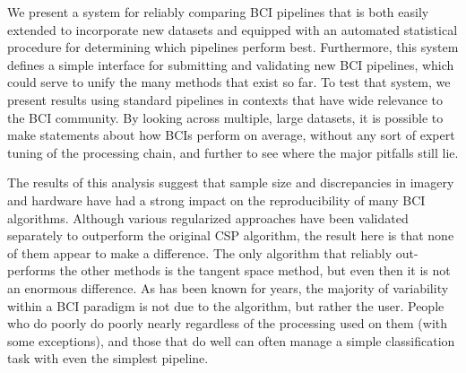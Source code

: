 We present a system for reliably comparing BCI pipelines that is both easily
extended to incorporate new datasets and equipped with an automated statistical
procedure for determining which pipelines perform best. Furthermore, this system
defines a simple interface for submitting and validating new BCI pipelines,
which could serve to unify the many methods that exist so far. To test that
system, we present results using standard pipelines in contexts that have wide
relevance to the BCI community. By looking across multiple, large datasets, it is possible to make statements about how BCIs perform on average, without any sort of expert tuning of the processing chain, and further to see where the major pitfalls still lie.

The results of this analysis suggest that sample size and discrepancies in imagery and hardware have had a strong impact on the reproducibility of many BCI algorithms. Although various regularized approaches have been validated separately to outperform the original CSP algorithm, the result here is that none of them appear to make a difference. The only algorithm that reliably out-performs the other methods is the tangent space method, but even then it is not an enormous difference. As has been known for years, the majority of variability within a BCI paradigm is not due to the algorithm, but rather the user. People who do poorly do poorly nearly regardless of the processing used on them (with some exceptions), and those that do well can often manage a simple classification task with even the simplest pipeline.


